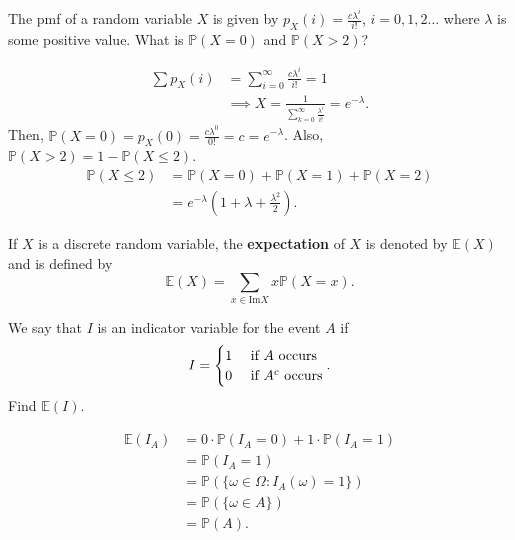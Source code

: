 \begin{eg}
	The pmf of a random variable \( X \) is given by \( p_X(i) = \frac{c\lambda ^i}{i!} \), \( i=0,1,2\ldots  \) where \( \lambda  \) is some positive value. What is \( \mathbb{P}(X=0) \) and \( \mathbb{P}(X>2) \)?
\end{eg}
\begin{explanation}
	\begin{align*}
		\sum p_X(i) &= \sum_{i=0}^{\infty} \frac{c\lambda ^i}{i!} = 1 \\
								&\implies X = \frac{1}{\sum_{k=0}^{\infty} \frac{\lambda ^i}{i!}} = e^{-\lambda } 
	.\end{align*}
	Then, \( \mathbb{P}(X=0)= p_X(0) = \frac{c\lambda ^{0} }{0!} = c = e^{-\lambda } \). Also, \( \mathbb{P}(X>2) = 1 - \mathbb{P}(X\le 2) \). 
	\begin{align*}
		\mathbb{P}(X\le 2) &= \mathbb{P}(X=0) + \mathbb{P}(X=1) + \mathbb{P}(X=2) \\
											 &= e^{-\lambda } \left( 1 + \lambda  + \frac{\lambda ^{2} }{2} \right) 
	.\end{align*}
\end{explanation}

\begin{definition}
	If \( X \) is a discrete random variable, the \textbf{expectation} of \( X \) is denoted by \( \mathbb{E}(X) \) and is defined by \[
		\mathbb{E}(X) = \sum_{x \in \text{Im} X} x\mathbb{P}(X=x)
	.\] 
\end{definition}

\begin{eg}
	We say that \( I \) is an indicator variable for the event \( A \) if \[
		I = \begin{cases}
			1 &\text{ if \( A \) occurs}\\
			0 &\text{ if \( A^{c} \) occurs}
		\end{cases}
	.\] Find \( \mathbb{E}(I) \).
\end{eg}
\begin{explanation}
	\begin{align*}
		\mathbb{E}(I_A) &= 0 \cdot \mathbb{P}(I_A=0) + 1 \cdot  \mathbb{P}(I_A = 1) \\
		&= \mathbb{P}(I_A=1) \\
		&= \mathbb{P}(\{\omega  \in \Omega : I_A(\omega ) = 1\}  ) \\
		&= \mathbb{P}(\{\omega  \in A\}  ) \\
		&= \mathbb{P}(A)
	.\end{align*}
\end{explanation}

